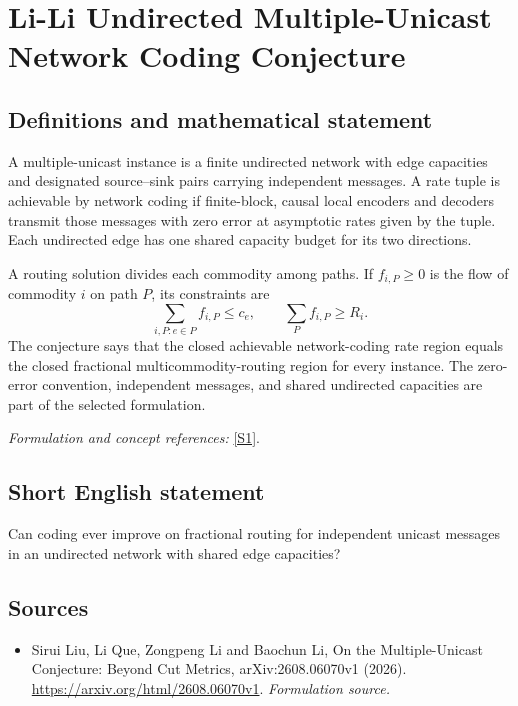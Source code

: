 \documentclass[11pt]{article}
\begin{document}
\section*{\texorpdfstring{Li-Li Undirected Multiple-Unicast Network Coding Conjecture}{Li-Li Undirected Multiple-Unicast Network Coding Conjecture}}\label{447}
\subsection{Definitions and mathematical statement}
A multiple-unicast instance is a finite undirected network with edge capacities and designated source--sink pairs carrying independent messages. A rate tuple is achievable by network coding if finite-block, causal local encoders and decoders transmit those messages with zero error at asymptotic rates given by the tuple. Each undirected edge has one shared capacity budget for its two directions.

A routing solution divides each commodity among paths. If $f_{i,P}\ge0$ is the flow of commodity $i$ on path $P$, its constraints are
\[
 \sum_{i,P:e\in P}f_{i,P}\le c_e,
 \qquad \sum_Pf_{i,P}\ge R_i.
\]
The conjecture says that the closed achievable network-coding rate region equals the closed fractional multicommodity-routing region for every instance. The zero-error convention, independent messages, and shared undirected capacities are part of the selected formulation.
\par\smallskip\textit{Formulation and concept references:} \href{https://arxiv.org/html/2608.06070v1}{[S1]}.

\subsection{Short English statement}
Can coding ever improve on fractional routing for independent unicast messages in an undirected network with shared edge capacities?
\subsection{Sources}
\begin{itemize}
\item[S1]Sirui Liu, Li Que, Zongpeng Li and Baochun Li, On the Multiple-Unicast Conjecture: Beyond Cut Metrics, arXiv:2608.06070v1 (2026).
\url{https://arxiv.org/html/2608.06070v1}.
\textit{Formulation source.}
\end{itemize}
\end{document}
